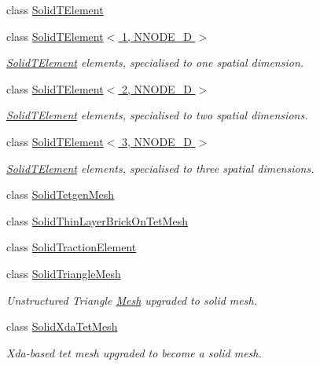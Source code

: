 \begin{DoxyCompactItemize}
\item 
class \hyperlink{classoomph_1_1SolidTElement}{Solid\+T\+Element}
\item 
class \hyperlink{classoomph_1_1SolidTElement_3_011_00_01NNODE__1D_01_4}{Solid\+T\+Element$<$ 1, N\+N\+O\+D\+E\+\_\+D $>$}
\begin{DoxyCompactList}\small\item\em \hyperlink{classoomph_1_1SolidTElement}{Solid\+T\+Element} elements, specialised to one spatial dimension. \end{DoxyCompactList}\item 
class \hyperlink{classoomph_1_1SolidTElement_3_012_00_01NNODE__1D_01_4}{Solid\+T\+Element$<$ 2, N\+N\+O\+D\+E\+\_\+D $>$}
\begin{DoxyCompactList}\small\item\em \hyperlink{classoomph_1_1SolidTElement}{Solid\+T\+Element} elements, specialised to two spatial dimensions. \end{DoxyCompactList}\item 
class \hyperlink{classoomph_1_1SolidTElement_3_013_00_01NNODE__1D_01_4}{Solid\+T\+Element$<$ 3, N\+N\+O\+D\+E\+\_\+D $>$}
\begin{DoxyCompactList}\small\item\em \hyperlink{classoomph_1_1SolidTElement}{Solid\+T\+Element} elements, specialised to three spatial dimensions. \end{DoxyCompactList}\item 
class \hyperlink{classoomph_1_1SolidTetgenMesh}{Solid\+Tetgen\+Mesh}
\item 
class \hyperlink{classoomph_1_1SolidThinLayerBrickOnTetMesh}{Solid\+Thin\+Layer\+Brick\+On\+Tet\+Mesh}
\item 
class \hyperlink{classoomph_1_1SolidTractionElement}{Solid\+Traction\+Element}
\item 
class \hyperlink{classoomph_1_1SolidTriangleMesh}{Solid\+Triangle\+Mesh}
\begin{DoxyCompactList}\small\item\em Unstructured Triangle \hyperlink{classoomph_1_1Mesh}{Mesh} upgraded to solid mesh. \end{DoxyCompactList}\item 
class \hyperlink{classoomph_1_1SolidXdaTetMesh}{Solid\+Xda\+Tet\+Mesh}
\begin{DoxyCompactList}\small\item\em Xda-\/based tet mesh upgraded to become a solid mesh. \end{DoxyCompactList}\item 

\end{DoxyCompactItemize}
